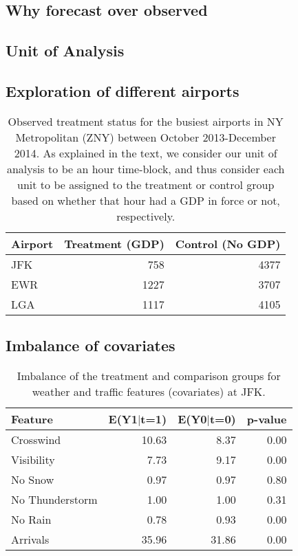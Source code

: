 \documentclass[11pt]{scrartcl}
\begin{document}
\subsection*{Why forecast over observed}

\subsection*{Unit of Analysis}

\subsection*{Exploration of different airports}

\begin{table}[!h]
\centering
\begin{tabular}{lrr}
\hline
Airport & Treatment (GDP) & Control (No GDP)\\
\hline
JFK & 758 & 4377 \\
EWR & 1227 & 3707 \\
LGA & 1117 & 4105 \\
\hline
\end{tabular}
\caption{Observed treatment status for the busiest airports in NY Metropolitan (ZNY) between October 2013-December 2014.  As explained in the text, we consider our unit of analysis to be an hour time-block, and thus consider each unit to be assigned to the treatment or control group based on whether that hour had a GDP in force or not, respectively.}
\label{tab:ap_treat_size}
\end{table}


\subsection*{Imbalance of covariates}
\begin{table}[ht]
\centering
\begin{tabular}{lrrr}
  \hline
 Feature & E(Y1$|$t=1) & E(Y0$|$t=0) & p-value \\ 
  \hline
  Crosswind & 10.63 & 8.37 & 0.00 \\ 
  Visibility & 7.73 & 9.17 & 0.00 \\ 
  No Snow & 0.97 & 0.97 & 0.80 \\ 
  No Thunderstorm & 1.00 & 1.00 & 0.31 \\ 
  No Rain & 0.78 & 0.93 & 0.00 \\ 
  Arrivals & 35.96 & 31.86 & 0.00 \\ 
   \hline
\end{tabular}
\caption{Imbalance of the treatment and comparison groups for weather and traffic features (covariates) at JFK.} 
\label{tab:imbalance}
\end{table}
\end{document}
